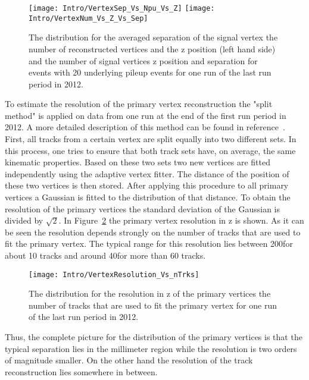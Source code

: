 \begin{figure}[!Hhtb]
    \centering
    \texttt{[image: Intro/VertexSep\_Vs\_Npu\_Vs\_Z]}
    \texttt{[image: Intro/VertexNum\_Vs\_Z\_Vs\_Sep]}
    \caption[Vertex separation \vs number of reconstructed vertices and \vs z position of the vertex. Number of signal vertices \vs z position and separation for events with 20 underlying pileup events]{The distribution for the averaged separation of the signal vertex \vs the number of reconstructed vertices and the z position (left hand side) and the number of signal vertices \vs z position and separation for events with 20 underlying pileup events for one run of the last run period in 2012. \label{plot:IntroVertexSep2D}}
\end{figure}

To estimate the resolution of the primary vertex reconstruction the "split method" is applied on data from one run at the end of the first run period in 2012. A more detailed description of this method can be found in reference~. First, all tracks from a certain vertex are split equally into two different sets. In this process, one tries to ensure that both track sets have, on average, the same kinematic properties. Based on these two sets two new vertices are fitted independently using the adaptive vertex fitter. The distance of the position of these two vertices is then stored. After applying this procedure to all primary vertices a Gaussian is fitted to the distribution of that distance. To obtain the resolution of the primary vertices the standard deviation of the Gaussian is divided by $\sqrt{2}$. In Figure~\ref{plot:IntroVertexRes} the primary vertex resolution in z is shown. As it can be seen the resolution depends strongly on the number of tracks that are used to fit the primary vertex. The typical range for this resolution lies between 200\mum for about 10 tracks and around 40\mum for more than 60 tracks.

\begin{figure}[!Hhtb]
    \centering
    \texttt{[image: Intro/VertexResolution\_Vs\_nTrks]}
    \caption[Vertex resolution \vs number of used tracks]{The distribution for the resolution in z of the primary vertices \vs the number of tracks that are used to fit the primary vertex for one run of the last run period in 2012. \label{plot:IntroVertexRes}}
\end{figure}

Thus, the complete picture for the distribution of the primary vertices is that the typical separation lies in the millimeter region while the resolution is two orders of magnitude smaller. On the other hand the resolution of the track reconstruction lies somewhere in between.\\

